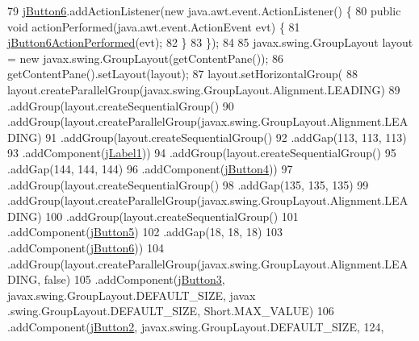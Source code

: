\begin{DoxyCode}
79         \mbox{\hyperlink{class_interfaz_package_1_1_interfaz_admin_aed43fc05f792f94859d625d8c69e9858}{jButton6}}.addActionListener(\textcolor{keyword}{new} java.awt.event.ActionListener() \{
80             \textcolor{keyword}{public} \textcolor{keywordtype}{void} actionPerformed(java.awt.event.ActionEvent evt) \{
81                 \mbox{\hyperlink{class_interfaz_package_1_1_interfaz_admin_ad3610dff3e28f93647357a5ba251d465}{jButton6ActionPerformed}}(evt);
82             \}
83         \});
84 
85         javax.swing.GroupLayout layout = \textcolor{keyword}{new} javax.swing.GroupLayout(getContentPane());
86         getContentPane().setLayout(layout);
87         layout.setHorizontalGroup(
88             layout.createParallelGroup(javax.swing.GroupLayout.Alignment.LEADING)
89             .addGroup(layout.createSequentialGroup()
90                 .addGroup(layout.createParallelGroup(javax.swing.GroupLayout.Alignment.LEADING)
91                     .addGroup(layout.createSequentialGroup()
92                         .addGap(113, 113, 113)
93                         .addComponent(\mbox{\hyperlink{class_interfaz_package_1_1_interfaz_admin_a616ba73f041fc46fb10107d67b98f5ad}{jLabel1}}))
94                     .addGroup(layout.createSequentialGroup()
95                         .addGap(144, 144, 144)
96                         .addComponent(\mbox{\hyperlink{class_interfaz_package_1_1_interfaz_admin_abe45cfffa25b1f68f153eb8dfed74132}{jButton4}}))
97                     .addGroup(layout.createSequentialGroup()
98                         .addGap(135, 135, 135)
99                         .addGroup(layout.createParallelGroup(javax.swing.GroupLayout.Alignment.LEADING)
100                             .addGroup(layout.createSequentialGroup()
101                                 .addComponent(\mbox{\hyperlink{class_interfaz_package_1_1_interfaz_admin_a158621407bca85eb067b4d84fb15f8f8}{jButton5}})
102                                 .addGap(18, 18, 18)
103                                 .addComponent(\mbox{\hyperlink{class_interfaz_package_1_1_interfaz_admin_aed43fc05f792f94859d625d8c69e9858}{jButton6}}))
104                             .addGroup(layout.createParallelGroup(javax.swing.GroupLayout.Alignment.LEADING,
       \textcolor{keyword}{false})
105                                 .addComponent(\mbox{\hyperlink{class_interfaz_package_1_1_interfaz_admin_a1c49c5af96e421af2c0e3e773995db35}{jButton3}}, javax.swing.GroupLayout.DEFAULT\_SIZE, javax
      .swing.GroupLayout.DEFAULT\_SIZE, Short.MAX\_VALUE)
106                                 .addComponent(\mbox{\hyperlink{class_interfaz_package_1_1_interfaz_admin_acc936e9e831e0d280f8bd3d6215d69d1}{jButton2}}, javax.swing.GroupLayout.DEFAULT\_SIZE, 124, 

\end{DoxyCode}
